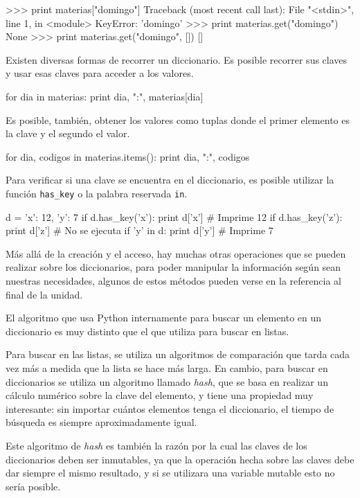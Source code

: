 \begin{codigo-python-sn}
>>> print materias["domingo"]
Traceback (most recent call last):
  File "<stdin>", line 1, in <module>
KeyError: 'domingo'
>>> print materias.get("domingo")
None
>>> print materias.get("domingo", [])
[]
\end{codigo-python-sn}

Existen diversas formas de recorrer un diccionario.  Es posible recorrer
sus claves y usar esas claves para acceder a los valores.

\begin{codigo-python-sn}
for dia in materias:
    print dia, ":", materias[dia]
\end{codigo-python-sn}

Es posible, también, obtener los valores como tuplas donde el primer
elemento es la clave y el segundo el valor.

\begin{codigo-python-sn}
for dia, codigos in materias.items():
    print dia, ":", codigos
\end{codigo-python-sn}

Para verificar si una clave se encuentra en el diccionario, es posible
utilizar la función \lstinline{has_key} o la palabra reservada
\lstinline{in}.

\begin{codigo-python-sn}
d = {'x': 12, 'y': 7}
if d.has_key('x'):
    print d['x']   # Imprime 12
if d.has_key('z'):
    print d['z']   # No se ejecuta
if 'y' in d:
    print d['y']   # Imprime 7
\end{codigo-python-sn}

Más allá de la creación y el acceso, hay muchas otras operaciones que se
pueden realizar sobre los diccionarios, para poder manipular la información
según sean nuestras necesidades, algunos de estos métodos pueden verse en
la referencia al final de la unidad.

\begin{sabias_que}
El algoritmo que usa Python internamente para buscar un elemento en un
diccionario es muy distinto que el que utiliza para buscar en listas.

Para buscar en las listas, se utiliza un algoritmos de comparación que
tarda cada vez más a medida que la lista se hace más larga.  En cambio,
para buscar en diccionarios se utiliza un algoritmo llamado {\it hash},
que se basa en realizar un cálculo numérico sobre la clave del elemento,
y tiene una propiedad muy interesante: sin importar cuántos elementos
tenga el diccionario, el tiempo de búsqueda es siempre aproximadamente
igual.

Este algoritmo de {\it hash} es también la razón por la cual las claves de
los diccionarios deben ser inmutables, ya que la operación hecha sobre las
claves debe dar siempre el mismo resultado, y si se utilizara una variable
mutable esto no sería posible.
\end{sabias_que}

